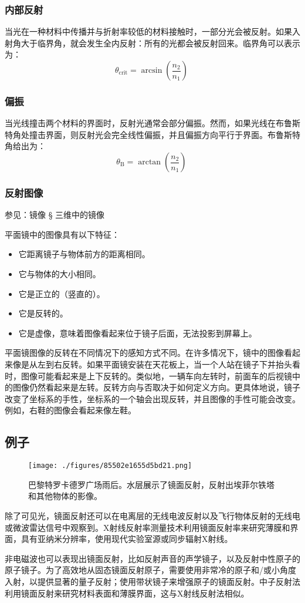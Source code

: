 \subsubsection{内部反射}

当光在一种材料中传播并与折射率较低的材料接触时，一部分光会被反射。如果入射角大于临界角，就会发生全内反射：所有的光都会被反射回来。临界角可以表示为：
\[
\theta_{\text{crit}} = \arcsin \left(\frac{n_2}{n_1}\right)~
\]
\subsubsection{偏振}
当光线撞击两个材料的界面时，反射光通常会部分偏振。然而，如果光线在布鲁斯特角处撞击界面，则反射光会完全线性偏振，并且偏振方向平行于界面。布鲁斯特角给出为：
\[
\theta_{\mathrm{B}} = \arctan \left(\frac{n_2}{n_1}\right)~
\]
\subsubsection{反射图像}

参见：镜像 § 三维中的镜像

平面镜中的图像具有以下特征：
\begin{itemize}
\item 它距离镜子与物体前方的距离相同。
\item 它与物体的大小相同。
\item 它是正立的（竖直的）。
\item 它是反转的。
\item 它是虚像，意味着图像看起来位于镜子后面，无法投影到屏幕上。
\end{itemize}
平面镜图像的反转在不同情况下的感知方式不同。在许多情况下，镜中的图像看起来像是从左到右反转。如果平面镜安装在天花板上，当一个人站在镜子下并抬头看时，图像可能看起来是上下反转的。类似地，一辆车向左转时，前面车的后视镜中的图像仍然看起来是左转。反转方向与否取决于如何定义方向。更具体地说，镜子改变了坐标系的手性，坐标系的一个轴会出现反转，并且图像的手性可能会改变。例如，右鞋的图像会看起来像左鞋。
\subsection{例子}
\begin{figure}[ht]
\centering
\texttt{[image: ./figures/85502e1655d5bd21.png]}
\caption{巴黎特罗卡德罗广场雨后。水层展示了镜面反射，反射出埃菲尔铁塔和其他物体的影像。} \label{fig_JMFS_5}
\end{figure}
除了可见光，镜面反射还可以在电离层的无线电波反射以及飞行物体反射的无线电或微波雷达信号中观察到。X射线反射率测量技术利用镜面反射率来研究薄膜和界面，具有亚纳米分辨率，使用现代实验室源或同步辐射X射线。

非电磁波也可以表现出镜面反射，比如反射声音的声学镜子，以及反射中性原子的原子镜子。为了高效地从固态镜面反射原子，需要使用非常冷的原子和/或小角度入射，以提供显著的量子反射；使用带状镜子来增强原子的镜面反射。中子反射法利用镜面反射来研究材料表面和薄膜界面，这与X射线反射法相似。
